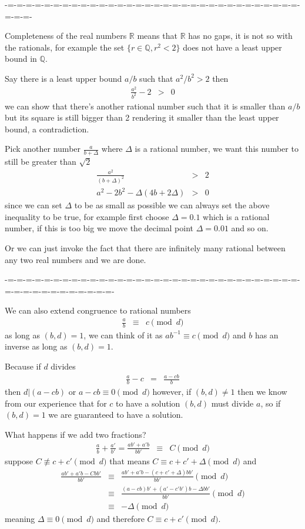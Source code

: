 \documentclass[aps,preprint,preprintnumbers,nofootinbib,showpacs,prd]{revtex4-1}
\newcommand{\nbea}{\begin{eqnarray*}}
\newcommand{\neea}{\end{eqnarray*}}
\begin{document}
-=-=-=-=-=-=-=-=-=-=-=-=-=-=-=-=-=-=-=-=-=-=-=-=-=-=-=-=-=-=-=-=-=-=-=-

Completeness of the real numbers $\mathbb{R}$ means that $\mathbb{R}$ has no gaps, it is not so with the rationals, for example the set $\{r \in \mathbb{Q}, r^2 < 2\}$ does not have a least upper bound in $\mathbb{Q}$.

Say there is a least upper bound $a/b$ such that $a^2/b^2 > 2$ then
%
\nbea
\frac{a^2}{b^2} - 2& > & 0
\neea
%
we can show that there's another rational number such that it is smaller than $a/b$ but its square is still bigger than 2 rendering it smaller than the least upper bound, a contradiction.

Pick another number $\frac{a}{b+\Delta}$ where $\Delta$ is a rational number, we want this number to still be greater than $\sqrt{2}$
%
\nbea
\frac{a^2}{(b+\Delta)^2} & > & 2 \\
a^2 - 2b^2 - \Delta(4b + 2\Delta) & > & 0
\neea
%
since we can set $\Delta$ to be as small as possible we can always set the above inequality to be true, for example first choose $\Delta = 0.1$ which is a rational number, if this is too big we move the decimal point $\Delta = 0.01$ and so on.

Or we can just invoke the fact that there are infinitely many rational between any two real numbers and we are done.

-=-=-=-=-=-=-=-=-=-=-=-=-=-=-=-=-=-=-=-=-=-=-=-=-=-=-=-=-=-=-=-=-=-=-=-=-=-=-=-=-=-=-=-=-

We can also extend congruence to rational numbers
%
\nbea
\frac{a}{b} & \equiv & c \pmod{d}
\neea
%
as long as $(b,d) = 1$, we can think of it as $a b^{-1} \equiv c \pmod{d}$ and $b$ has an inverse as long as $(b,d) = 1$.

Because if $d$ divides
%
\nbea
\frac{a}{b} - c & = & \frac{a - cb}{b}
\neea
%
then $d|(a-cb)$ or $a - cb \equiv 0 \pmod{d}$ however, if $(b,d) \neq 1$ then we know from our experience that for $c$ to have a solution $(b,d)$ must divide $a$, so if $(b,d) = 1$ we are guaranteed to have a solution.

What happens if we add two fractions?
%
\nbea
\frac{a}{b} + \frac{a'}{b'} = \frac{ab' + a'b}{bb'} & \equiv & C \pmod{d}
\neea
%
suppose $C \not\equiv c + c' \pmod{d}$ that means $C \equiv c + c' + \Delta \pmod{d}$ and
%
\nbea
\frac{ab' + a'b - Cbb'}{bb'} & \equiv & \frac{ab' + a'b - (c + c' + \Delta)bb'}{bb'} \pmod{d} \\
& \equiv & \frac{(a - cb)b' + (a' - c'b')b - \Delta bb'}{bb'} \pmod{d} \\
& \equiv & -\Delta \pmod{d}
\neea
%
meaning $\Delta \equiv 0 \pmod{d}$ and therefore $C \equiv c + c' \pmod{d}$.
\end{document}
